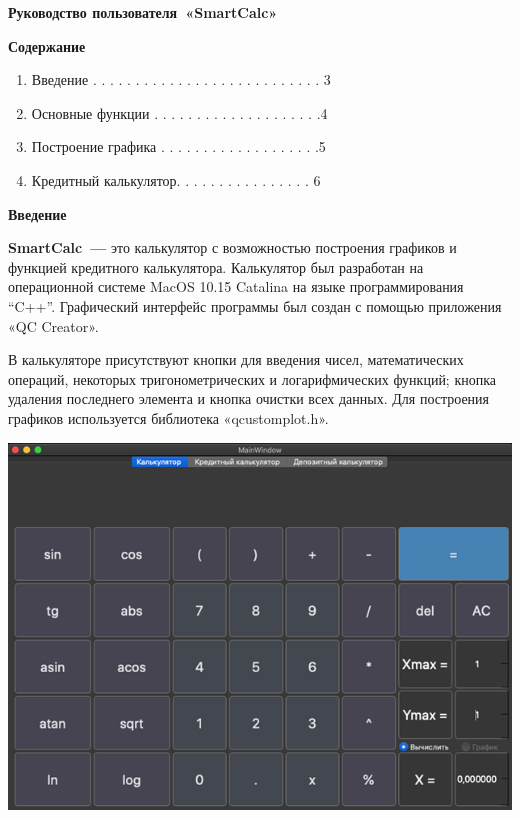 \documentclass[]{article}
\date{}
\begin{document}
\begin{center}

\Huge

\textbf{Руководство пользователя~«SmartCalc»}
\end{center}
\pagebreak[5]
\huge
\textbf{Содержание}

\LARGE
\begin{enumerate}
\def\labelenumi{\arabic{enumi}.}
\item
\textmd{Введение . . . . . . . . . . . . . . . . . . . . . . . . . . . 3}
\item
\textmd{Основные
  функции . . . . . . . . . . . . . . . . . . . .4}
\item
\textmd{Построение
  графика . . . . . . . . . . . . . . . . . . .5}
\item
\textmd{Кредитный
  калькулятор. . . . . . . . . . . . . . . . 6}
\end{enumerate}
\pagebreak[5]
\huge
\textbf{Введение}
\newline
\LARGE

\textbf{SmartCalc~---} это калькулятор с возможностью построения
графиков и функцией кредитного калькулятора. Калькулятор был разработан
на операционной системе MacOS 10.15 Catalina на языке программирования
``C++''. Графический интерфейс программы был создан с помощью приложения
«QC Creator».

В калькуляторе присутствуют кнопки для введения чисел, математических
операций, некоторых тригонометрических и логарифмических функций; кнопка
удаления последнего элемента и кнопка очистки всех данных. Для
построения графиков используется библиотека «qcustomplot.h».

\includegraphics[bb=0 0 700 450]{media/image1.png}
\end{document}
